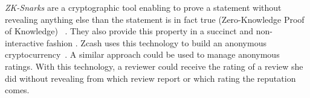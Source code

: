 \emph{ZK-Snarks} are a cryptographic tool enabling to prove a statement without
revealing anything else than the statement is in fact true (Zero-Knowledge Proof
of Knowledge) ~\cite{blum1988non,bitansky2013succinct}. They also provide this
property in a succinct and non-interactive fashion . Zcash uses this technology to build an anonymous
cryptocurrency~\cite{sasson2014zerocash}. A similar approach could be used to
manage anonymous ratings. With this technology, a reviewer could receive the
rating of a review she did without revealing from which review report or which
rating the reputation comes.


